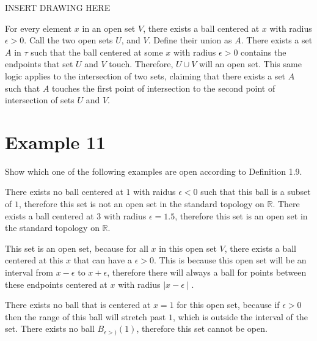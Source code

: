 \documentclass{report}
\begin{document}
INSERT DRAWING HERE


For every element $x$ in an open set $V$, there exists a ball centered at $x$ with radius $\epsilon > 0$. Call the two open sets $U$, and $V$. Define their union as $A$. There exists a set $A$ in $\tau$ such that the ball centered at some $x$ with radius $\epsilon > 0$ contains the endpoints that set $U$ and $V$ touch. Therefore, $U \cup V$ will an open set. This same logic applies to the intersection of two sets, claiming that there exists a set $A$ such that $A$ touches the first point of intersection to the second point of intersection of sets $U$ and $V$. 


\medskip
\section{Example 11}
\begin{center} 
    Show which one of the following examples are open according to Definition 1.9. 
\end{center}

\medskip
\sol There exists no ball centered at $1$ with raidus $\epsilon < 0$ such that this ball is a subset of ${1}$, therefore this set is not an open set in the standard topology on $\mathbb{R}$. 
\medskip
{}
\medskip
\sol There exists a ball centered at $3$ with radius $\epsilon = 1.5$, therefore this set is an open set in the standard topology on $\mathbb{R}$.  
\medskip

\medskip

\sol This set is an open set, because for all $x$ in this open set $V$, there exists a ball centered at this $x$ that can have a $\epsilon > 0$. This is because this open set will be an interval from $x -  \epsilon$ to $x + \epsilon$, therefore there will always a ball for points between these endpoints centered at $x$ with radius $\mid x - \epsilon \mid$. 
\medskip

\qs{1.11.d}{The interval $[0, 1)$ in $\mathbb{R}$.}
\medskip

\sol There exists no ball that is centered at $x = 1$ for this open set, because if $\epsilon > 0$ then the range of this ball will stretch past $1$, which is outside the interval of the set. There exists no ball $B_{\epsilon > )}(1)$, therefore this set cannot be open.  
\medskip
\end{document}
